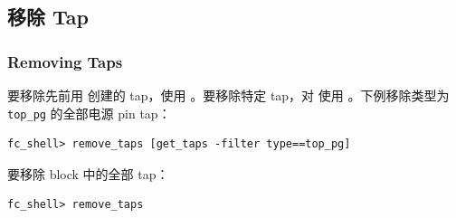 \subsection{移除 Tap}
\subsubsection*{Removing Taps}

要移除先前用  创建的 tap，使用 。要移除特定 tap，对  使用 。下例移除类型为 \texttt{top\_pg} 的全部电源 pin tap：
\begin{lstlisting}
fc_shell> remove_taps [get_taps -filter type==top_pg]
\end{lstlisting}

要移除 block 中的全部 tap：
\begin{lstlisting}
fc_shell> remove_taps
\end{lstlisting}
